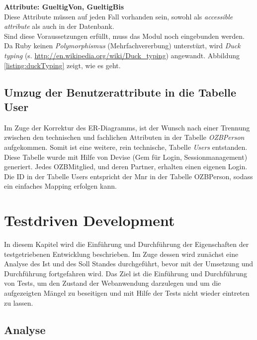 \documentclass[12pt,             %
               a4paper,          %
               listof=totoc,     %
               index=totoc,      %
               bibliography=totoc,%
               oneside,         %
               BCOR1cm,          %
               english   %
               ]{scrbook}
\begin{document}
\textbf{Attribute: GueltigVon, GueltigBis}\\
Diese Attribute müssen auf jeden Fall vorhanden sein, sowohl als \textit{accessible attribute} als auch in der Datenbank. \\

Sind diese Voraussetzungen erfüllt, muss das Modul noch eingebunden werden. Da Ruby keinen \textit{Polymorphismus} (Mehrfachvererbung) unterstüzt, wird \textit{Duck typing} (s. \url{http://en.wikipedia.org/wiki/Duck_typing}) angewandt. Abbildung \vref{listing:duckTyping} zeigt, wie es geht.

\label{listing:duckTyping}


\section{Umzug der Benutzerattribute in die Tabelle User}
Im Zuge der Korrektur des ER-Diagramms, ist der Wunsch nach einer Trennung zwischen den technischen und fachlichen Attributen in der Tabelle \textit{OZBPerson} aufgekommen. Somit ist eine weitere, rein technische, Tabelle \textit{Users} entstanden. Diese Tabelle wurde mit Hilfe von Devise (Gem für Login, Sessionmanagement) generiert. Jedes OZBMitglied, und deren Partner, erhalten einen eigenen Login. Die ID in der Tabelle Users entspricht der Mnr in der Tabelle OZBPerson, sodass ein einfaches Mapping erfolgen kann.

\clearpage
\chapter{Testdriven Development}
In diesem Kapitel wird die Einführung und Durchführung der Eigenschaften der testgetriebenen Entwicklung beschrieben. Im Zuge dessen wird zunächst eine Analyse des Ist und des Soll Standes durchgeführt, bevor mit der Umsetzung und Durchführung fortgefahren wird. Das Ziel ist die Einführung und Durchführung von Tests, um den Zustand der Webanwendung darzulegen und um die aufgezeigten Mängel zu beseitigen und mit Hilfe der Tests nicht wieder eintreten zu lassen.    

\section{Analyse}
\end{document}
